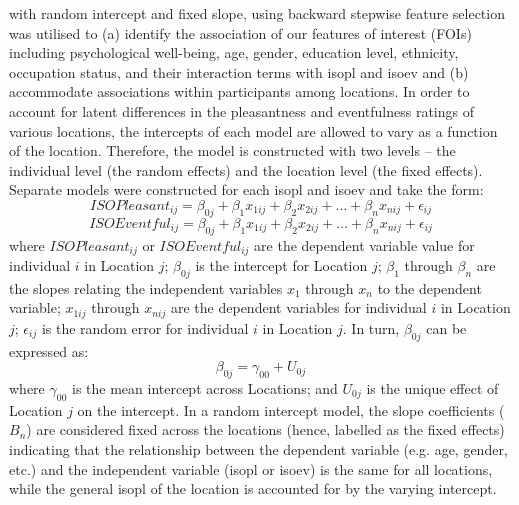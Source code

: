  with random intercept and fixed slope, using backward stepwise feature selection was utilised to (a) identify the association of our features of interest (FOIs) including psychological well-being, age, gender, education level, ethnicity, occupation status, and their interaction terms with \gls{isopl} and \gls{isoev} and (b) accommodate associations within participants among locations. In order to account for latent differences in the pleasantness and eventfulness ratings of various locations, the intercepts of each model are allowed to vary as a function of the location. Therefore, the model is constructed with two levels -- the individual level (the random effects) and the location level (the fixed effects). Separate models were constructed for each \gls{isopl} and \gls{isoev} and take the form:
%
\begin{equation}
  \label{eqn:whoPl}
  ISOPleasant_{ij} = \beta_{0j} + \beta_1 x_{1ij} + \beta_2 x_{2ij} + \ldots + \beta_n x_{nij} + \epsilon_{ij}
\end{equation}
%
\begin{equation}
  \label{eqn:whoEv}
  ISOEventful_{ij} = \beta_{0j} + \beta_1 x_{1ij} + \beta_2 x_{2ij} + \ldots + \beta_n x_{nij} + \epsilon_{ij}
\end{equation}
%
where $ISOPleasant_{ij}$ or $ISOEventful_{ij}$ are the dependent variable value for individual $i$ in Location $j$; $\beta_{0j}$ is the intercept for Location $j$; $\beta_1$ through $\beta_n$ are the slopes relating the independent variables $x_1$ through $x_n$ to the dependent variable; $x_{1ij}$ through $x_{nij}$ are the dependent variables for individual $i$ in Location $j$; $\epsilon_{ij}$ is the random error for individual $i$ in Location $j$. In turn, $\beta_{0j}$ can be expressed as:
%
\begin{equation}
  \beta_{0j} = \gamma_{00} + U_{0j}
\end{equation}
%
where $\gamma_{00}$ is the mean intercept across Locations; and $U_{0j}$ is the unique effect of Location $j$ on the intercept. In a random intercept model, the slope coefficients ($B_n$) are considered fixed across the locations (hence, labelled as the fixed effects) indicating that the relationship between the dependent variable (e.g. age, gender, etc.) and the independent variable (\gls{isopl} or \gls{isoev}) is the same for all locations, while the general \gls{isopl} of the location is accounted for by the varying intercept.

